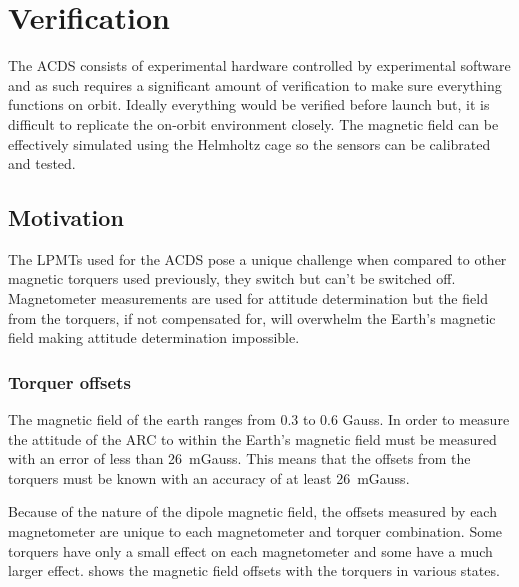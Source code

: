 
\chapter{Verification}

\label{ch:Verification}

The \ac{ACDS} consists of experimental hardware controlled by experimental software and as such requires a significant amount of verification to make sure everything functions on orbit. Ideally everything would be verified before launch but, it is difficult to replicate the on-orbit environment closely. The magnetic field can be effectively simulated using the Helmholtz cage so the sensors can be calibrated and tested. 

\section{Motivation}

The \acp{LPMT} used for the \ac{ACDS} pose a unique challenge when compared to other magnetic torquers used previously, they switch but can't be switched off. Magnetometer measurements are used for attitude determination but the field from the torquers, if not compensated for, will overwhelm the Earth's magnetic field making attitude determination impossible.

\subsection{Torquer offsets}





The magnetic field of the earth ranges from 0.3 to 0.6 Gauss\cite[pp.~114]{Wertz}. In order to measure the attitude of the \ac{ARC} to within {\textdegree} the Earth's magnetic field must be measured with an error of less than 26~mGauss. This means that the offsets from the torquers must be known with an accuracy of at least 26~mGauss. 

Because of the nature of the dipole magnetic field, the offsets measured by each magnetometer are unique to each magnetometer and torquer combination. Some torquers have only a small effect on each magnetometer and some have a much larger effect.  shows the magnetic field offsets with the torquers in various states. 

